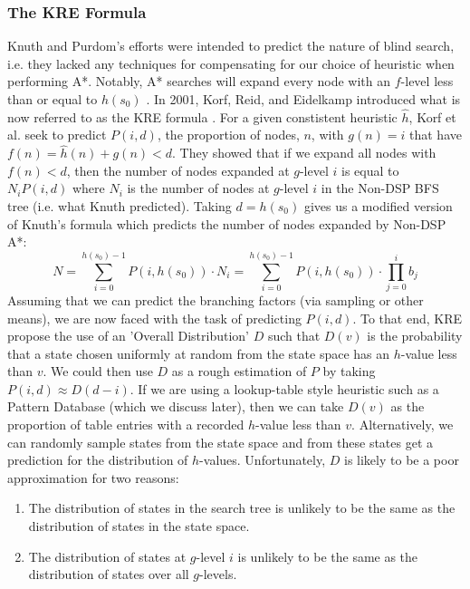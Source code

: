 \documentclass{article}
\begin{document}
\subsubsection*{The KRE Formula}
Knuth and Purdom's efforts were intended to predict the nature of blind search, i.e. they lacked any
techniques for compensating for our choice of heuristic when performing A*.
Notably, A* searches will expand every node with an \(f\)-level less than or equal to \(h(s_0)\) \cite{pearl1984heuristics}.
In 2001, Korf, Reid, and Eidelkamp introduced what is now referred to as the KRE formula \cite{korf2001time}.
For a given constistent heuristic \(\hat{h}\), Korf et al. seek to predict \(P(i, d)\), the proportion of nodes, \(n\), with \(g(n) = i\) that have \(f(n) = \hat{h}(n) + g(n) < d\).
They showed that if we expand all nodes with \(f(n) < d\), then
the number of nodes expanded at \(g\)-level \(i\) is equal to \(N_{i} P(i, d)\) where \(N_i\) is
the number of nodes at \(g\)-level \(i\) in the Non-DSP BFS tree (i.e. what Knuth predicted).
Taking \(d = h(s_0)\) gives us a modified version of Knuth's formula which predicts
the number of nodes expanded by Non-DSP A*:
\[N = \sum^{h(s_0) - 1}_{i = 0} P(i, h(s_0)) \cdot N_{i} = \sum^{h(s_0) - 1}_{i = 0} P(i, h(s_0)) \cdot \prod^{i}_{j = 0} b_j \]
Assuming that we can predict the branching factors (via sampling or other means),
we are now faced with the task of predicting \(P(i,d)\). To that end,
KRE propose the use of an 'Overall Distribution' \(D\) such that \(D(v)\) is
the probability that a state chosen uniformly at random from the state space has an \(h\)-value less than \(v\).
We could then use \(D\) as a rough estimation of \(P\) by taking \(P(i,d) \approx D(d-i)\).
If we are using a lookup-table style heuristic such as a Pattern Database (which we discuss later),
then we can take \(D(v)\) as the proportion of table entries with a recorded \(h\)-value
less than \(v\).
Alternatively, we can randomly sample states from the state space and from these states
get a prediction for the distribution of \(h\)-values.
Unfortunately, \(D\) is likely to be a poor approximation for two reasons:
\begin{enumerate}
\item The distribution of states in the search tree is unlikely to be the same as the distribution of states in the state space.
\item The distribution of states at \(g\)-level \(i\) is unlikely to be the same as the distribution of states over all \(g\)-levels.
\end{enumerate}
\end{document}
